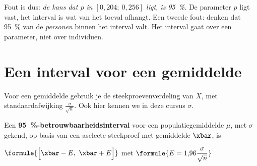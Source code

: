 Fout is dus: \textit{de kans dat $p$ in $[0{,}204;\ 0{,}256]$ ligt, is 95~\%}. De parameter $p$ ligt vast, het interval is wat van het toeval afhangt. Een tweede fout: denken dat 95~\% van de \textit{personen} binnen het interval valt. Het interval gaat over een parameter, niet over individuen.

\begin{oefeningen}

\end{oefeningen}

\section{Een interval voor een gemiddelde}

Voor een gemiddelde gebruik je de steekproevenverdeling van $\overline{X}$, met standaardafwijking $\frac{\sigma}{\sqrt n}$. Ook hier kennen we in deze cursus $\sigma$.

\begin{theorie}
Een \textbf{\textcolor{accent}{95~\%-betrouwbaarheidsinterval}} voor een populatiegemiddelde $\mu$, met $\sigma$ gekend, op basis van een aselecte steekproef met gemiddelde $\xbar$, is

\vspace{1mm}
\qquad $\formule{\Bigl[\xbar - E,\ \xbar + E\Bigr]}$ \quad met \quad $\formule{E = 1{,}96 \dfrac{\sigma}{\sqrt{n}}}$
\end{theorie}


\begin{oefeningen}

\end{oefeningen}

